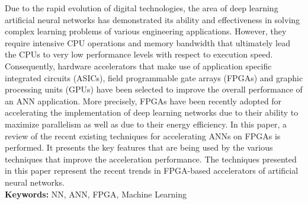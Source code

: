 
Due to the rapid evolution of digital technologies, the area of deep learning artificial neural networks has demonstrated its ability and  effectiveness in solving complex learning problems of various engineering applications. However, they require intensive CPU operations and memory bandwidth that ultimately lead the CPUs to very low performance levels with respect to execution speed. Consequently, hardware accelerators that make use of application specific integrated circuits (ASICs), field programmable gate arrays (FPGAs) and graphic processing units (GPUs) have been selected to improve the overall performance of an ANN application. More precisely, FPGAs have been recently adopted for accelerating the implementation of deep learning networks due to their ability to maximize parallelism as well as due to their energy efficiency. 
In this paper, a review of the recent existing techniques for accelerating ANNs on FPGAs is performed. It presents the key features that are being used by the various techniques that improve the acceleration performance. The techniques presented in this paper represent the recent trends in FPGA-based accelerators of artificial neural networks. \\
\textbf{Keywords:} NN, ANN, FPGA, Machine Learning
